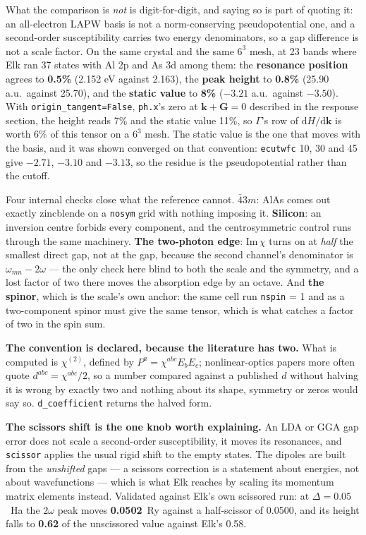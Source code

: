 \documentclass[11pt,a4paper]{article}
\newcommand{\code}[1]{\texttt{\small #1}}
\begin{document}
What the comparison is \emph{not} is digit-for-digit, and saying so is part of
quoting it: an all-electron LAPW basis is not a norm-conserving pseudopotential
one, and a second-order susceptibility carries two energy denominators, so a gap
difference is not a scale factor. On the same crystal and the same $6^3$ mesh,
at 23 bands where Elk ran 37 states with Al 2p and As 3d among them: the
\textbf{resonance position} agrees to \textbf{0.5\%} (2.152 eV against 2.163),
the \textbf{peak height} to \textbf{0.8\%} (25.90 a.u.\ against 25.70), and the
\textbf{static value} to \textbf{8\%} ($-3.21$ a.u.\ against $-3.50$). With
\code{origin\_tangent=False}, \code{ph.x}'s zero at $\mathbf k+\mathbf G=0$
described in the response section, the height reads 7\% and the static value
11\%, so $\Gamma$'s row of $\mathrm{d}H/\mathrm{d}\mathbf k$ is worth 6\% of this
tensor on a $6^3$ mesh. The static value is the one that moves with the basis,
and it was shown converged on that convention: \code{ecutwfc} 10, 30 and 45 give
$-2.71$, $-3.10$ and $-3.13$, so the residue is the pseudopotential rather than
the cutoff.

Four internal checks close what the reference cannot. \textbf{$\bar 43m$}: AlAs
comes out exactly zincblende on a \code{nosym} grid with nothing imposing it.
\textbf{Silicon}: an inversion centre forbids every component, and the
centrosymmetric control runs through the same machinery. \textbf{The two-photon
edge}: $\mathrm{Im}\,\chi$ turns on at \emph{half} the smallest direct gap, not
at the gap, because the second channel's denominator is $\omega_{mn}-2\omega$ ---
the only check here blind to both the scale and the symmetry, and a lost factor
of two there moves the absorption edge by an octave. And \textbf{the spinor},
which is the scale's own anchor: the same cell run \code{nspin} = 1 and as a
two-component spinor must give the same tensor, which is what catches a factor of
two in the spin sum.

\textbf{The convention is declared, because the literature has two.} What is
computed is $\chi^{(2)}$, defined by $P^a = \chi^{abc}E_bE_c$; nonlinear-optics
papers more often quote $d^{abc} = \chi^{abc}/2$, so a number compared against a
published $d$ without halving it is wrong by exactly two and nothing about its
shape, symmetry or zeros would say so. \code{d\_coefficient} returns the halved
form.

\textbf{The scissors shift is the one knob worth explaining.} An LDA or GGA gap
error does not scale a second-order susceptibility, it moves its resonances, and
\code{scissor} applies the usual rigid shift to the empty states. The dipoles are
built from the \emph{unshifted} gaps --- a scissors correction is a statement
about energies, not about wavefunctions --- which is what Elk reaches by scaling
its momentum matrix elements instead. Validated against Elk's own scissored run:
at $\Delta = 0.05$~Ha the $2\omega$ peak moves \textbf{0.0502}~Ry against a
half-scissor of 0.0500, and its height falls to \textbf{0.62} of the unscissored
value against Elk's 0.58.
\end{document}
